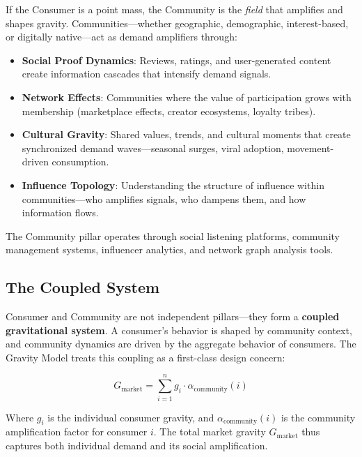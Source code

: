 \documentclass[11pt,a4paper,twocolumn]{article}
\begin{document}
If the Consumer is a point mass, the Community is the \textit{field} that amplifies and shapes gravity. Communities---whether geographic, demographic, interest-based, or digitally native---act as demand amplifiers through:

\begin{itemize}[leftmargin=1.5em]
  \item \textbf{Social Proof Dynamics}: Reviews, ratings, and user-generated content create information cascades that intensify demand signals.
  \item \textbf{Network Effects}: Communities where the value of participation grows with membership (marketplace effects, creator ecosystems, loyalty tribes).
  \item \textbf{Cultural Gravity}: Shared values, trends, and cultural moments that create synchronized demand waves---seasonal surges, viral adoption, movement-driven consumption.
  \item \textbf{Influence Topology}: Understanding the structure of influence within communities---who amplifies signals, who dampens them, and how information flows.
\end{itemize}

The Community pillar operates through social listening platforms, community management systems, influencer analytics, and network graph analysis tools.

\subsection{The Coupled System}

Consumer and Community are not independent pillars---they form a \textbf{coupled gravitational system}. A consumer's behavior is shaped by community context, and community dynamics are driven by the aggregate behavior of consumers. The Gravity Model treats this coupling as a first-class design concern:

\begin{equation}
G_{\text{market}} = \sum_{i=1}^{n} g_i \cdot \alpha_{\text{community}}(i)
\label{eq:market-gravity}
\end{equation}

Where $g_i$ is the individual consumer gravity, and $\alpha_{\text{community}}(i)$ is the community amplification factor for consumer $i$. The total market gravity $G_{\text{market}}$ thus captures both individual demand and its social amplification.
\end{document}
